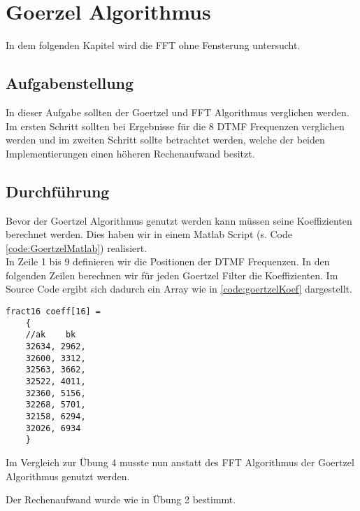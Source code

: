 \chapter{Goerzel Algorithmus}\label{Goertzel}
In dem folgenden Kapitel wird die FFT ohne Fensterung untersucht. 
\section{Aufgabenstellung}\label{GoertzelAuf}
In dieser Aufgabe sollten der Goertzel und FFT Algorithmus verglichen werden. Im ersten Schritt sollten bei Ergebnisse für die 8 DTMF Frequenzen verglichen werden und im zweiten Schritt sollte betrachtet werden, welche der beiden Implementierungen einen höheren Rechenaufwand besitzt. 
\section{Durchführung}\label{GoertzelDur}
Bevor der Goertzel Algorithmus genutzt werden kann müssen seine Koeffizienten berechnet werden. Dies haben wir in einem Matlab Script (s. Code \autoref{code:GoertzelMatlab}) realisiert.\\

In Zeile 1 bis 9 definieren wir die Positionen der DTMF Frequenzen. In den folgenden Zeilen berechnen wir für jeden Goertzel Filter die Koeffizienten.
Im Source Code ergibt sich dadurch ein Array wie in \autoref{code:goertzelKoef} dargestellt.
\begin{lstlisting}[caption={Array der Goertzel - Koeffizienten}, label={code:goertzelKoef}]
	fract16 coeff[16] = 
	{ 
	//ak	bk
	32634, 2962,
	32600, 3312,
	32563, 3662,
	32522, 4011,
	32360, 5156,
	32268, 5701, 
	32158, 6294,
	32026, 6934
	}
\end{lstlisting}
Im Vergleich zur Übung 4 musste nun anstatt des FFT Algorithmus der Goertzel Algorithmus genutzt werden.

Der Rechenaufwand wurde wie in Übung 2 bestimmt. 
